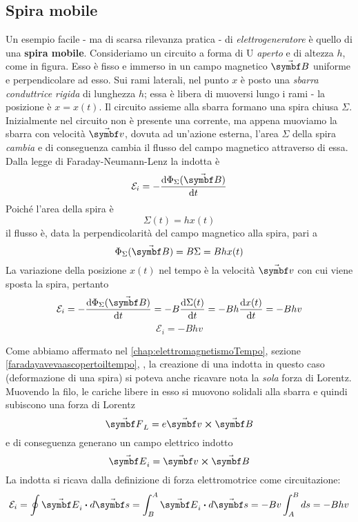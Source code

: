 \subsection{Spira mobile}\label{spiramobilegeneratori}
Un esempio facile - ma di scarsa rilevanza pratica - di \textit{elettrogeneratore} è quello di una \textbf{spira mobile}. Consideriamo un circuito a forma di U \textit{aperto} e di altezza $h$, come in figura.
Esso è fisso e immerso in un campo magnetico $\vba{B}$ uniforme e perpendicolare ad esso. Sui rami laterali, nel punto $x$ è posto una \textit{sbarra conduttrice rigida} di lunghezza $h$; essa è libera di muoversi lungo i rami - la posizione è $x=x(t)$. Il circuito assieme alla sbarra formano una spira chiusa $\Sigma$.\\
Inizialmente nel circuito non è presente una corrente, ma appena muoviamo la sbarra con velocità $\vba{v}$, dovuta ad un'azione esterna, l'area $\Sigma$ della spira \textit{cambia} e di conseguenza cambia il flusso del campo magnetico attraverso di essa. Dalla legge di Faraday-Neumann-Lenz la \fem indotta è
\begin{equation*}
	\mathcal{E}_i=-\dv{\Phi_{\Sigma}(\vba{B})}{t}
\end{equation*}
Poiché l'area della spira è
\begin{equation*}
	\Sigma(t)=hx(t)
\end{equation*}
il flusso è, data la perpendicolarità del campo magnetico alla spira, pari a
\begin{equation*}
	\Phi_{\Sigma}(\vba{B})=B\Sigma=Bhx(t)
\end{equation*}
La variazione della posizione $x(t)$ nel tempo è la velocità $\vba{v}$ con cui viene sposta la spira, pertanto
\begin{equation*}
	\mathcal{E}_i=-\dv{\Phi_{\Sigma}(\vba{B})}{t}=-B\dv{\Sigma(t)}{t}=-Bh\dv{x(t)}{t}=-Bhv
\end{equation*}
\begin{equation}
	\mathcal{E}_i=-Bhv
\end{equation}
\begin{observe}
	Come abbiamo affermato nel \autoref{chap:elettromagnetismoTempo}, sezione \ref{faradayavevaascopertoiltempo}, \pageref{faradayavevaascopertoiltempo}, la creazione di una \fem indotta in questo caso (deformazione di una spira) si poteva anche ricavare nota la \textit{sola} forza di Lorentz.\\
	Muovendo la filo, le cariche libere in esso si muovono solidali alla sbarra e quindi subiscono una forza di Lorentz
	\begin{equation*}
		\vba{F}_L=e\vba{v}\cross\vba{B}
	\end{equation*}
	e di conseguenza generano un campo elettrico indotto
	\begin{equation*}
		\vba{E}_i=\vba{v}\cross\vba{B}
	\end{equation*}
	La \fem indotta si ricava dalla definizione di forza elettromotrice come circuitazione:
	\begin{equation*}
		\mathcal{E}_i=\oint \vba{E}_i\vdot d\vba{s}=\int_{B}^{A}\vba{E}_i\vdot d\vba{s}=-Bv\int_{A}^{B}ds=-Bhv
	\end{equation*}
\end{observe}
